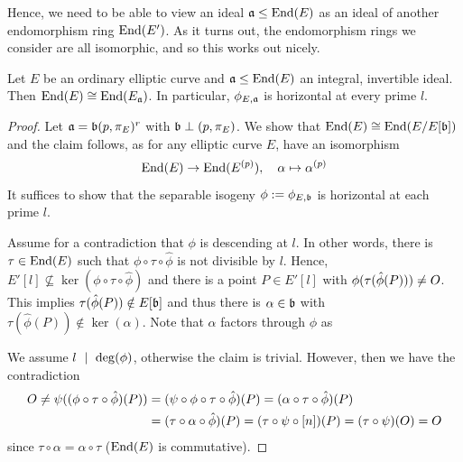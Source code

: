 Hence, we need to be able to view an ideal $\mathfrak{a} \leq \mathrm{End}(E)$ as an ideal of another endomorphism ring $\mathrm{End}(E')$.
As it turns out, the endomorphism rings we consider are all isomorphic, and so this works out nicely. 
\begin{lemma}
    Let $E$ be an ordinary elliptic curve and $\mathfrak{a} \leq \mathrm{End}(E)$ an integral, invertible ideal.
    Then $\mathrm{End}(E) \cong \mathrm{End}(E_{\mathfrak{a}})$.
    In particular, $\phi_{E, \mathfrak{a}}$ is horizontal at every prime $l$.
\end{lemma}
\begin{proof}
    Let $\mathfrak{a} = \mathfrak{b}(p, \pi_E)^r$ with $\mathfrak{b} \perp (p, \pi_E)$.
    We show that $\mathrm{End}(E) \cong \mathrm{End}(E/E[\mathfrak{b}])$ and the claim follows, as for any elliptic curve $E$, have an isomorphism
    \begin{equation*}
        \mathrm{End}(E) \to \mathrm{End}(E^{(p)}), \quad \alpha \mapsto \alpha^{(p)}
    \end{equation*}
    It suffices to show that the separable isogeny $\phi := \phi_{E, \mathfrak{b}}$ is horizontal at each prime $l$.

    Assume for a contradiction that $\phi$ is descending at $l$.
    In other words, there is $\tau \in \mathrm{End}(E)$ such that $\phi \circ \tau \circ \hat{\phi}$ is not divisible by $l$.
    Hence, $E'[l] \not\subseteq \ker(\phi \circ \tau \circ \hat{\phi})$ and there is a point $P \in E'[l]$ with $\phi(\tau(\hat{\phi}(P))) \neq O$.
    This implies $\tau(\hat{\phi}(P)) \notin E[\mathfrak{b}]$ and thus there is $\alpha \in \mathfrak{b}$ with $\tau(\hat{\phi}(P)) \notin \ker(\alpha)$.
    Note that $\alpha$ factors through $\phi$ as
    \begin{center}
    \end{center}
    We assume $l \ \mid \  \deg(\phi)$, otherwise the claim is trivial.
    However, then we have the contradiction
    \begin{align*}
        O \neq \psi((\phi \circ \tau \circ \hat{\phi})(P)) &= (\psi \circ \phi \circ \tau \circ \hat{\phi})(P) = (\alpha \circ \tau \circ \hat{\phi})(P) \\
        &= (\tau \circ \alpha \circ \hat{\phi})(P) = (\tau \circ \psi \circ [n])(P) = (\tau \circ \psi)(O) = O
    \end{align*}
    since $\tau \circ \alpha = \alpha \circ \tau$ ($\mathrm{End}(E)$ is commutative).
\end{proof}
